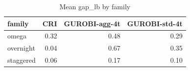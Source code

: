 \begin{table}[htbp]
\centering
\small
\caption{Mean gap\_lb by family}
\label{tab:E7_gurobi_threads_b60_by_family}
\begin{tabular}{lrrr}
\toprule
family & CRI & GUROBI-agg-4t & GUROBI-std-4t \\
\midrule
omega & 0.32 & 0.48 & 0.29 \\
overnight & 0.04 & 0.67 & 0.35 \\
staggered & 0.06 & 0.17 & 0.10 \\
\bottomrule
\end{tabular}
\end{table}
